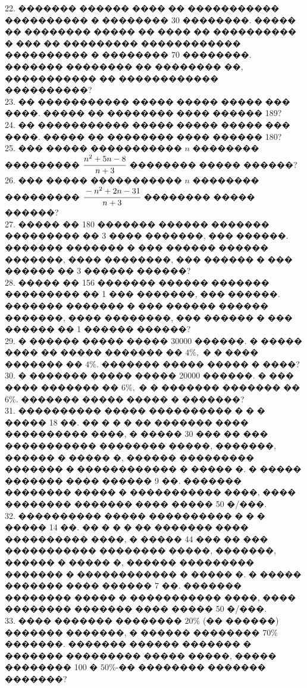 \documentclass[12pt]{article}
\begin{document}
22. ������� ������ ���� �� ����������� ���������� � �������� 30 ��������. ����� �� �������� ����� �� ���� �� ���������� � ��� �� ��������� ������������ ���������� � �������� 70 ��������. ������� �������� �� �������� ��, ����������� �� ������������ ����������?\\
23. �� ����������� ����� ����� ����� ��� ����. ����� �� �������� ���� ������ 189?\\
24. �� ����������� ����� ����� ����� ��� ����. ����� �� �������� ���� ������ 180?\\
25. ��� ����� ����������� $n$ �������� ��������� $\cfrac{n^2+5n-8}{n+3}$ �������� ����� ������?\\
26. ��� ����� ����������� $n$ �������� ��������� $\cfrac{-n^2+2n-31}{n+3}$ �������� ����� ������?\\
27. ����� �� 180 ������� ������ ������� ��������� �� 3 ���� �������, ��� ������. ������� ������� � ��� ������ ������ �������, ���� ��������, ��� ������ � ��� ������ �� 3 ������ ������?\\
28. ����� �� 156 ������� ������ ������� ��������� �� 1 ��� �������, ��� ������. ������� ������� � ��� ������ ������ �������, ���� ��������, ��� ������ � ��� ������ �� 1 ������ ������?\\
29. � ������ ����� ����� 30000 ������. � ����� ���� �� ����� ������� �� $4\%,$ � � ���� ������� �� $4\%.$ ������� ����� ����� � ����?\\
30. � ������� ����� ����� 20000 ������. � ��� ���� ������� �� $6\%,$ � � ������� �������
�� $6\%.$ ������� ����� ����� � �������?\\
31. ���������� ����� ���������� � � � ����� 18 ��. �� � � � �� ������� ���� ���������� ����, � ����� 30 ��� �� ��� ����������� �������� �����, �������, ������ � ����� �, ������ ��������� ������� � ������������ � ����� �. � ����� ������� ���� ������ 9 ��. ������� �������� ����� � ����������� ����, ���� �������� ������� ���� ����� 50 �/���.\\
32. ���������� ����� ���������� � � � ����� 14 ��. �� � � � �� ������� ���� ���������� ����, � ����� 44 ��� �� ��� ����������� �������� �����, �������, ������ � ����� �, ������ ��������� ������� � ������������ � ����� �. � ����� ������� ���� ������ 7 ��. ������� �������� ����� � ����������� ����, ���� �������� ������� ���� ����� 50 �/���.\\
33. ���� ������� �������� $20\%$ (�� ������) ������� �������, � ������ �������� $70\%$ �������. ������� ������ ������� � ������� ��������� ����� �����, ����� �������� 100 � $50\%$-�� �������� ������� �������?\\
\end{document}

